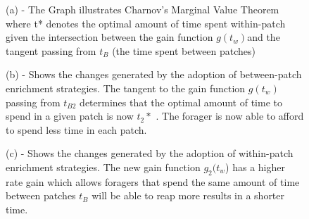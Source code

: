 \documentclass{mproj}
\begin{document}
\begin{figure} [!ht] 
	\centering
	\caption{(a) - The Graph illustrates Charnov's Marginal Value Theorem  where t* denotes the optimal amount of time spent within-patch given the intersection between the gain function $g(t_w)$and the tangent passing from $t_B$ (the time spent between patches)}
           \label{gain1}
\end{figure}
\begin{figure} [!ht] 
	\centering
	\caption{(b) - Shows the changes generated by the adoption of between-patch enrichment strategies. The tangent to the gain function $g(t_w)$ passing from $t_{B2}$  determines that the optimal amount of time to spend in a given patch is now $t_2*$ . The forager is now able to afford to spend less time in each patch.}
           \label{gain1}
\end{figure}
\begin{figure} [!ht] 
	\centering
	\caption{(c) - Shows the changes generated by the adoption of within-patch enrichment strategies. The new gain function $g_2(t_w$) has a higher rate gain which  allows foragers that spend the same amount of time between patches $t_B$ will be able to reap more results in a shorter time.}
           \label{gain1}
\end{figure}
\end{document}
